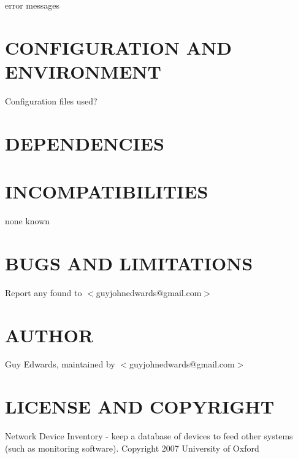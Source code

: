 \documentclass{book}
\begin{document}
error messages


\section{CONFIGURATION AND ENVIRONMENT}
\label{_CONFIGURATION_AND_ENVIRONMENT}
\hypertarget{_CONFIGURATION_AND_ENVIRONMENT}{}



Configuration files used?


\section{DEPENDENCIES}
\label{_DEPENDENCIES}
\hypertarget{_DEPENDENCIES}{}


\section{INCOMPATIBILITIES}
\label{_INCOMPATIBILITIES}
\hypertarget{_INCOMPATIBILITIES}{}



none known


\section{BUGS AND LIMITATIONS}
\label{_BUGS_AND_LIMITATIONS}
\hypertarget{_BUGS_AND_LIMITATIONS}{}



Report any found to $<$guyjohnedwards@gmail.com$>$


\section{AUTHOR}
\label{_AUTHOR}
\hypertarget{_AUTHOR}{}



Guy Edwards, maintained by $<$guyjohnedwards@gmail.com$>$


\section{LICENSE AND COPYRIGHT}
\label{_LICENSE_AND_COPYRIGHT}
\hypertarget{_LICENSE_AND_COPYRIGHT}{}



Network Device Inventory - keep a database of devices to feed other systems (such as monitoring software). Copyright 2007 University of Oxford
\end{document}
